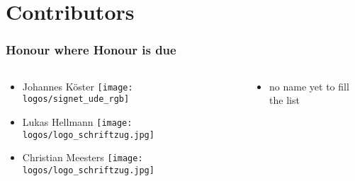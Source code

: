 \section{Contributors}

\begin{frame}
  \frametitle{Honour where Honour is due}
  \begin{columns}
  	\begin{column}{.5\textwidth}
  	   \begin{itemize}
  	   	\item Johannes Köster \texttt{[image: logos/signet\_ude\_rgb]}
  	   	\item Lukas Hellmann \texttt{[image: logos/logo\_schriftzug.jpg]}
  	   	\item Christian Meesters \texttt{[image: logos/logo\_schriftzug.jpg]}
  	   \end{itemize}	
  	\end{column}
    \begin{column}{.5\textwidth}
    	\begin{itemize}
    		\item no name yet to fill the list
    	\end{itemize}	
    \end{column}
  \end{columns}
		
\end{frame}


